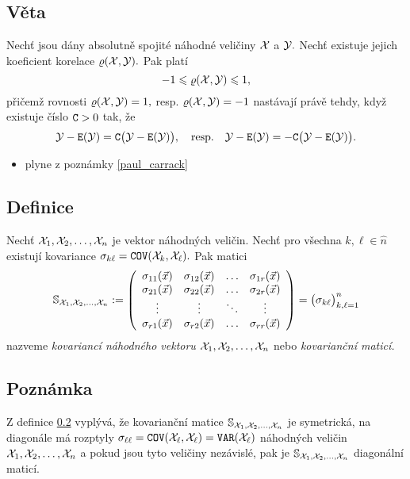 \subsection{V\v eta}

Nech\v t jsou d\'any absolutn\v e spojit\'e n\'ahodn\'e veli\v ciny ${\mathcal X}$ a ${\mathcal Y}.$ Nech\v t existuje jejich koeficient korelace $\varrho({\mathcal X},{\mathcal Y}).$ Pak plat\'i $$-1 \leqslant \varrho({\mathcal X},{\mathcal Y}) \leqslant 1,$$ p\v ri\v cem\v z rovnosti $\varrho({\mathcal X},{\mathcal Y})=1,$ resp. $\varrho({\mathcal X},{\mathcal Y})=-1$  nast\'avaj\'i pr\'av\v e tehdy, kdy\v z existuje \v c\'islo $\mathtt{C}>0$ tak, \v ze $${\mathcal Y}-\mathtt{E}({\mathcal Y})=\mathtt{C}\bigl({\mathcal Y}-\mathtt{E}({\mathcal Y})\bigr), \quad \text{resp.} \quad {\mathcal Y}-\mathtt{E}({\mathcal Y})=-\mathtt{C}\bigl({\mathcal Y}-\mathtt{E}({\mathcal Y})\bigr).$$

\Proof

\begin{itemize}
\item plyne z pozn\'amky \ref{paul_carrack}
\end{itemize}

\subsection{Definice}\label{wishing}

Nech\v t ${\mathcal X}_1,{\mathcal X}_2,\ldots,{\mathcal X}_n$ je vektor n\'ahodn\'ych veli\v cin. Nech\v t pro v\v sechna $k, \ell\in \widehat{n}$ existuj\'i kovariance $\sigma_{k\ell}=\mathtt{COV}({\mathcal X}_k,{\mathcal X}_\ell).$ Pak matici
%
$${\mathbb S}_{{\mathcal X}_1,{\mathcal X}_2,\ldots,{\mathcal X}_n}:=\left(\begin{array}{cccc}
\sigma_{11}({\vec{x}})  & \sigma_{12}({\vec{x}})  & \ldots & \sigma_{1r}({\vec{x}})  \\
\sigma_{21}({\vec{x}})  & \sigma_{22}({\vec{x}})  & \ldots & \sigma_{2r}({\vec{x}}) \\
\vdots & \vdots & \ddots & \vdots \\
\sigma_{r1}({\vec{x}})  & \sigma_{r2}({\vec{x}})  & \ldots & \sigma_{rr}({\vec{x}})
\end{array}\right)=  \bigl(\sigma_{k\ell}\bigr)_{k,\ell=1}^n$$
%
nazveme \emph{kovarianc\'i n\'ahodn\'eho vektoru} ${\mathcal X}_1,{\mathcal X}_2,\ldots,{\mathcal X}_n$ nebo \emph{kovarian\v cn\'i matic\'i.}


\subsection{Pozn\'amka}

Z definice \ref{wishing} vyplývá, \v ze kovarian\v cn\'i matice ${\mathbb S}_{{\mathcal X}_1,{\mathcal X}_2,\ldots,{\mathcal X}_n}$ je symetrická, na diagonále má rozptyly $\sigma_{\ell\ell}=\mathtt{COV}({\mathcal X}_\ell,{\mathcal X}_\ell)=\mathtt{VAR}({\mathcal X}_\ell)$ náhodných veličin ${\mathcal X}_1,{\mathcal X}_2,\ldots,{\mathcal X}_n$ a pokud jsou tyto veličiny nezávislé, pak je ${\mathbb S}_{{\mathcal X}_1,{\mathcal X}_2,\ldots,{\mathcal X}_n}$ diagonální matic\'i.
